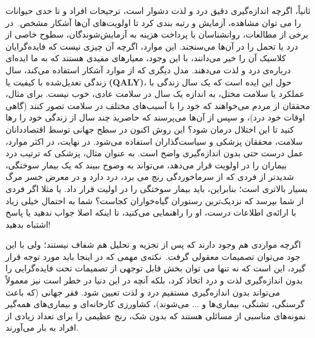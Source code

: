 ثانیاً، اگرچه اندازه‌گیری دقیق درد و لذت دشوار است، ترجیحات افراد و تا حدی حیوانات را می توان مشاهده، آزمایش و رتبه بندی کرد تا اولویت‌های آن‌ها آشکار مشخص.\     در برخی از مطالعات، روانشناسان با پرداخت هزینه به آزمایش‌شوندگان، سطوح خاصی از درد یا تحمل را در آن‌ها می‌سنجند.
این موارد، اگرچه آن چیزی نیست که فایده‌گرایان کلاسیک آن را خیر می‌دانند، با این وجود، معیارهای مفیدی هستند که به ما ایده‌ای درباره‌ی درد و لذت می‌دهند.
مدل دیگری که از موارد آشکار استفاده می‌کند، سال زندگی تعدیل‌شده با کیفیت یا \textenglish{\textbf{(QALY)}}، حول این ایده است که یک سال زندگی با عملکرد یا سلامت مختل، به اندازه یک سال در سلامت عادی، خوب نیست.
برای مثال، محققان از مردم می‌خواهند که خود را با آسیب‌های مختلف در سلامت تصور کنند (گاهی اوقات خود درد)، و سپس از آن‌ها می‌پرسند که حاضرید چند سال از زندگی خود را رها کنید تا این اختلال درمان شود؟ این روش اکنون در سطح جهانی توسط اقتصاددانان سلامت، محققان پزشکی و سیاست‌گذاران استفاده می‌شود.
در نهایت، در اکثر موارد، عمل درست حتی بدون اندازه‌گیری واضح است.
به عنوان مثال، پزشکی که ترتیب درد بیماران را در اولویت قرار می‌دهد، می‌تواند به وضوح ببیند که یک بیمار سوختگی، شدیدتر از فردی که از سرماخوردگی رنج می برد، درد دارد و در معرض خسر مرگ بسیار بالاتری است؛ بنابراین، باید بیمار سوختگی را در اولیت قرار داد.
یا مثلا اگر فردی از شما بپرسد که نزدیک‌ترین رستوران گیاه‌خواران کجاست؟ شما به احتمال خیلی زیاد با ارائه‌ی اطلاعات درست، او را راهنمایی می‌کنید، تا اینکه اصلا جواب ندهید یا پاسخ اشتباه بدهید!

اگرچه مواردی هم وجود دارند که پس از تجزیه و تحلیل هم شفاف نیستند؛ ولی با این جود می‌توان تصمیمات معقولی گرفت.\     نکته‌ی مهمی که در اینجا باید مورد توجه قرار گیرد، این است که نه تنها می توان بخش قابل توجهی از تصمیمات تحت فایده‌گرایی را بدون اندازه‌گیری لذت و درد اتخاذ کرد، بلکه آنچه در این دنیا در خطر است نیز معمولاً می‌تواند بدون اندازه‌گیری مستقیم درد و لذت تعیین شود.
فقر جهانی (که باعث گرسنگی، تشنگی، بیماری‌ها و ... می‌شوند)، کشاورزی کارخانه‌ای و بیماری‌های همه‌گیر نمونه‌های مناسبی از مسائلی هستند که بدون شک، رنج عظیمی را برای تعداد زیادی از افراد به بار می‌آورند.
\newline
\newline

